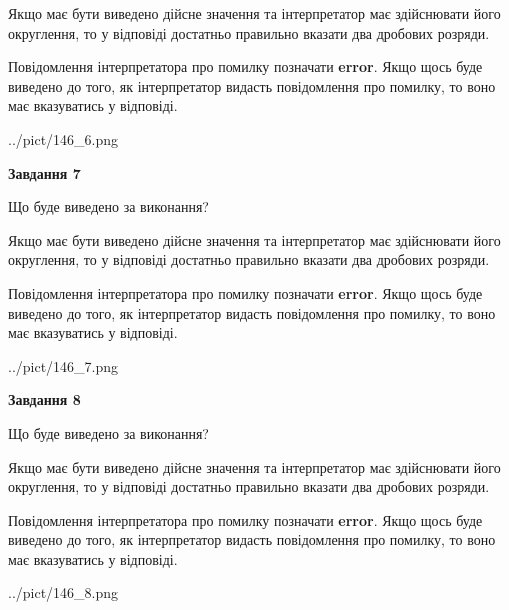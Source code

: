 \documentclass[12pt, ukrainian]{article}
\begin{document}
{\begin {Large}
Якщо має бути виведено дійсне значення та інтерпретатор має здійснювати його округлення, 
то у відповіді достатньо правильно вказати два дробових розряди.

Повідомлення інтерпретатора про помилку позначати \textbf{error}.
Якщо щось буде виведено до того, як інтерпретатор видасть повідомлення про помилку, 
то воно має вказуватись у відповіді. \par

\begin{center}
	{../pict/146_6.png}
\end{center}
\newpage

{\begin {center}\textbf{Завдання 7}\end {center}}\par
Що буде виведено за виконання? \par

Якщо має бути виведено дійсне значення та інтерпретатор має здійснювати його округлення, 
то у відповіді достатньо правильно вказати два дробових розряди.

Повідомлення інтерпретатора про помилку позначати \textbf{error}.
Якщо щось буде виведено до того, як інтерпретатор видасть повідомлення про помилку, 
то воно має вказуватись у відповіді. \par

\begin{center}
	{../pict/146_7.png}
\end{center}
\newpage

{\begin {center}\textbf{Завдання 8}\end {center}}\par
Що буде виведено за виконання? \par

Якщо має бути виведено дійсне значення та інтерпретатор має здійснювати його округлення, 
то у відповіді достатньо правильно вказати два дробових розряди.

Повідомлення інтерпретатора про помилку позначати \textbf{error}.
Якщо щось буде виведено до того, як інтерпретатор видасть повідомлення про помилку, 
то воно має вказуватись у відповіді. \par

\begin{center}
	{../pict/146_8.png}
\end{center}
\newpage


\end{Large}}
\end{document}

